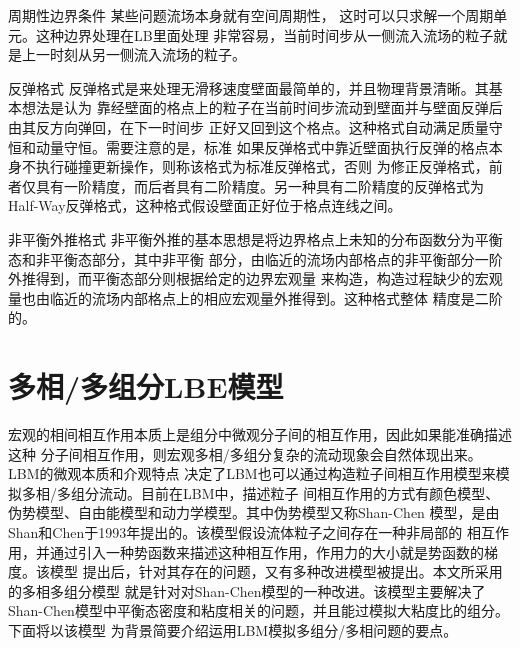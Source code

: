\begin{myDescription}
\item[周期性边界条件]
某些问题流场本身就有空间周期性， 这时可以只求解一个周期单元。这种边界处理在LB里面处理
非常容易，当前时间步从一侧流入流场的粒子就是上一时刻从另一侧流入流场的粒子。

\item[反弹格式]
反弹格式是来处理无滑移速度壁面最简单的，并且物理背景清晰。其基本想法是认为
靠经壁面的格点上的粒子在当前时间步流动到壁面并与壁面反弹后由其反方向弹回，在下一时间步
正好又回到这个格点。这种格式自动满足质量守恒和动量守恒。需要注意的是，标准
如果反弹格式中靠近壁面执行反弹的格点本身不执行碰撞更新操作，则称该格式为标准反弹格式，否则
为修正反弹格式，前者仅具有一阶精度，而后者具有二阶精度。另一种具有二阶精度的反弹格式为
Half-Way反弹格式，这种格式假设壁面正好位于格点连线之间。

\item[非平衡外推格式]
非平衡外推的基本思想是将边界格点上未知的分布函数分为平衡态和非平衡态部分，其中非平衡
部分，由临近的流场内部格点的非平衡部分一阶外推得到，而平衡态部分则根据给定的边界宏观量
来构造，构造过程缺少的宏观量也由临近的流场内部格点上的相应宏观量外推得到。这种格式整体
精度是二阶的。
\end{myDescription}

\section{多相/多组分LBE模型}\label{sec:lbm_multiphase}
宏观的相间相互作用本质上是组分中微观分子间的相互作用，因此如果能准确描述这种
分子间相互作用，则宏观多相/多组分复杂的流动现象会自然体现出来。LBM的微观本质和介观特点
决定了LBM也可以通过构造粒子间相互作用模型来模拟多相/多组分流动。目前在LBM中，描述粒子
间相互作用的方式有颜色模型、伪势模型、自由能模型和动力学模型。其中伪势模型又称Shan-Chen
模型，是由Shan和Chen于1993年提出的。该模型假设流体粒子之间存在一种非局部的
相互作用，并通过引入一种势函数来描述这种相互作用，作用力的大小就是势函数的梯度。该模型
提出后，针对其存在的问题，又有多种改进模型被提出。本文所采用的多相多组分模型
就是针对对Shan-Chen模型的一种改进。该模型主要解决了
Shan-Chen模型中平衡态密度和粘度相关的问题，并且能过模拟大粘度比的组分。下面将以该模型
为背景简要介绍运用LBM模拟多组分/多相问题的要点。

